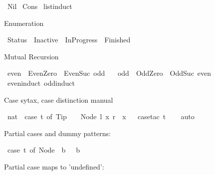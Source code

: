\begin{isabellebody}
\isamarkupfalse%
\ {\isachardoublequoteopen}Nil{\isachardoublequoteclose}\isanewline
{}\isamarkupfalse%
\ {\isachardoublequoteopen}Cons{\isachardoublequoteclose}\isanewline
\isanewline
{}\isamarkupfalse%
\ list{\isachardot}{\kern0pt}induct%
\begin{isamarkuptext}%
Enumeration%
\end{isamarkuptext}\isamarkuptrue%
\isamarkupfalse%
\ Status\ {\isacharequal}{\kern0pt}\ Inactive\ {\isacharbar}{\kern0pt}\ InProgress\ {\isacharbar}{\kern0pt}\ Finished%
\begin{isamarkuptext}%
Mutual Recursion%
\end{isamarkuptext}\isamarkuptrue%
\isamarkupfalse%
\ even\ {\isacharequal}{\kern0pt}\ EvenZero\ {\isacharbar}{\kern0pt}\ EvenSuc\ odd\isanewline
\ \ \ odd\ {\isacharequal}{\kern0pt}\ OddZero\ {\isacharbar}{\kern0pt}\ OddSuc\ even\ \isanewline
\isanewline
{}\isamarkupfalse%
\ even{\isachardot}{\kern0pt}induct\ odd{\isachardot}{\kern0pt}induct%
\begin{isamarkuptext}%
Case sytax, case distinction manual%
\end{isamarkuptext}\isamarkuptrue%
\isamarkupfalse%
\ {\isachardoublequoteopen}{\isacharparenleft}{\kern0pt}{}{\isacharcolon}{\kern0pt}{\isacharcolon}{\kern0pt}nat{\isacharparenright}{\kern0pt}\ {\isasymle}\ {\isacharparenleft}{\kern0pt}case\ t\ of\ Tip\ {\isasymRightarrow}\ {}\ {\isacharbar}{\kern0pt}\ Node\ l\ x\ r\ {\isasymRightarrow}\ x{\isacharplus}{\kern0pt}{}{\isacharparenright}{\kern0pt}{\isachardoublequoteclose}\isanewline
%
\isadelimproof
\ \ %
\endisadelimproof
%
\isatagproof
{}\isamarkupfalse%
{\isacharparenleft}{\kern0pt}case{\isacharunderscore}{\kern0pt}tac\ t{\isacharparenright}{\kern0pt}\isanewline
\ \ \isamarkupfalse%
\ auto\isanewline
\ \ \isamarkupfalse%
%
\endisatagproof
{\isafoldproof}%
%
\isadelimproof
%
\endisadelimproof
%
\begin{isamarkuptext}%
Partial cases and dummy patterns:%
\end{isamarkuptext}\isamarkuptrue%
\isamarkupfalse%
\ {\isachardoublequoteopen}case\ t\ of\ Node\ {\isacharunderscore}{\kern0pt}\ b\ {\isacharunderscore}{\kern0pt}\ {\isacharequal}{\kern0pt}{\isachargreater}{\kern0pt}\ b{\isachardoublequoteclose}%
\begin{isamarkuptext}%
Partial case maps to 'undefined':%

\end{isamarkuptext}
\end{isabellebody}
